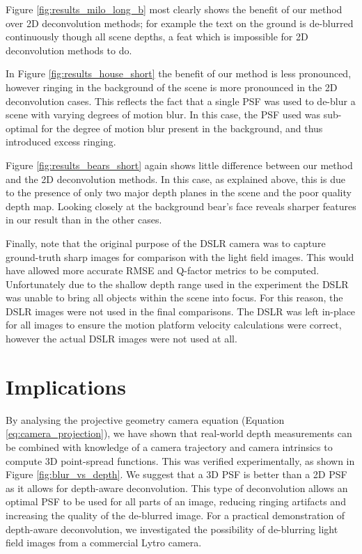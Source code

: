 Figure \ref{fig:results_milo_long_b} most clearly shows the benefit of our method over 2D deconvolution methods; for example the text on the ground is de-blurred continuously though all scene depths, a feat which is impossible for 2D deconvolution methods to do.

In Figure \ref{fig:results_house_short} the benefit of our method is less pronounced, however ringing in the background of the scene is more pronounced in the 2D deconvolution cases.
This reflects the fact that a single PSF was used to de-blur a scene with varying degrees of motion blur.
In this case, the PSF used was sub-optimal for the degree of motion blur present in the background, and thus introduced excess ringing.

Figure \ref{fig:results_bears_short} again shows little difference between our method and the 2D deconvolution methods.
In this case, as explained above, this is due to the presence of only two major depth planes in the scene and the poor quality depth map.
Looking closely at the background bear's face reveals sharper features in our result than in the other cases.

Finally, note that the original purpose of the DSLR camera was to capture ground-truth sharp images for comparison with the light field images.
This would have allowed more accurate RMSE and Q-factor metrics to be computed.
Unfortunately due to the shallow depth range used in the experiment the DSLR was unable to bring all objects within the scene into focus.
For this reason, the DSLR images were not used in the final comparisons.
The DSLR was left in-place for all images to ensure the motion platform velocity calculations were correct, however the actual DSLR images were not used at all.

\section{Implications}
\label{sec:implications}

By analysing the projective geometry camera equation (Equation \ref{eq:camera_projection}), we have shown that real-world depth measurements can be combined with knowledge of a camera trajectory and camera intrinsics to compute 3D point-spread functions.
This was verified experimentally, as shown in Figure \ref{fig:blur_vs_depth}.
We suggest that a 3D PSF is better than a 2D PSF as it allows for depth-aware deconvolution.
This type of deconvolution allows an optimal PSF to be used for all parts of an image, reducing ringing artifacts and increasing the quality of the de-blurred image.
For a practical demonstration of depth-aware deconvolution, we investigated the possibility of de-blurring light field images from a commercial Lytro camera.

